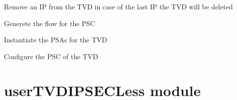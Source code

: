 \documentclass[letterpaper,10pt,oneside]{sphinxmanual}
\begin{document}
\begin{fulllineitems}
\begin{fulllineitems}
\label{userTVD:userTVD.UserTVD.deleteTVD}
Remove an IP from the TVD in case of the last IP the TVD will be deleted

\end{fulllineitems}


\begin{fulllineitems}
\label{userTVD:userTVD.UserTVD.generatePSCflows}
Generete the flow for the PSC

\end{fulllineitems}


\begin{fulllineitems}
\label{userTVD:userTVD.UserTVD.instantiatePSA}
Instantiate the PSAs for the TVD

\end{fulllineitems}


\begin{fulllineitems}
\label{userTVD:userTVD.UserTVD.setPSC}
Configure the PSC of the TVD

\end{fulllineitems}


\end{fulllineitems}



\chapter{userTVDIPSECLess module}
\label{userTVDIPSECLess:module-userTVDIPSECLess}\label{userTVDIPSECLess:usertvdipsecless-module}\label{userTVDIPSECLess::doc}
\end{document}
